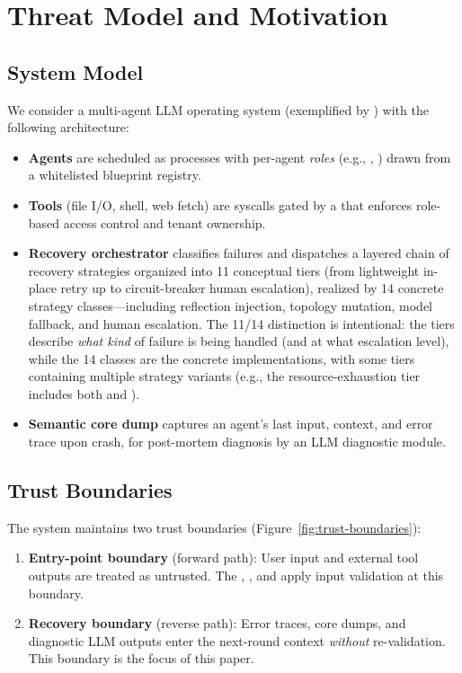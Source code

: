 
\section{Threat Model and Motivation}
\label{sec:threat-model}

\subsection{System Model}

We consider a multi-agent LLM operating system (exemplified by \system{}) with the following architecture:
\begin{itemize}[leftmargin=*]
    \item \textbf{Agents} are scheduled as processes with per-agent \emph{roles} (e.g., , ) drawn from a whitelisted blueprint registry.
    \item \textbf{Tools} (file I/O, shell, web fetch) are syscalls gated by a  that enforces role-based access control and tenant ownership.
    \item \textbf{Recovery orchestrator} classifies failures and dispatches a layered chain of recovery strategies organized into 11 conceptual tiers (from lightweight in-place retry up to circuit-breaker human escalation), realized by 14 concrete strategy classes---including reflection injection, topology mutation, model fallback, and human escalation. The 11/14 distinction is intentional: the tiers describe \emph{what kind} of failure is being handled (and at what escalation level), while the 14 classes are the concrete implementations, with some tiers containing multiple strategy variants (e.g., the resource-exhaustion tier includes both  and ).
    \item \textbf{Semantic core dump} captures an agent's last input, context, and error trace upon crash, for post-mortem diagnosis by an LLM diagnostic module.
\end{itemize}

\subsection{Trust Boundaries}

The system maintains two trust boundaries (Figure~\ref{fig:trust-boundaries}):
\begin{enumerate}[leftmargin=*]
    \item \textbf{Entry-point boundary} (forward path): User input and external tool outputs are treated as untrusted. The , , and  apply input validation at this boundary.
    \item \textbf{Recovery boundary} (reverse path): Error traces, core dumps, and diagnostic LLM outputs enter the next-round context \emph{without} re-validation. This boundary is the focus of this paper.
\end{enumerate}

